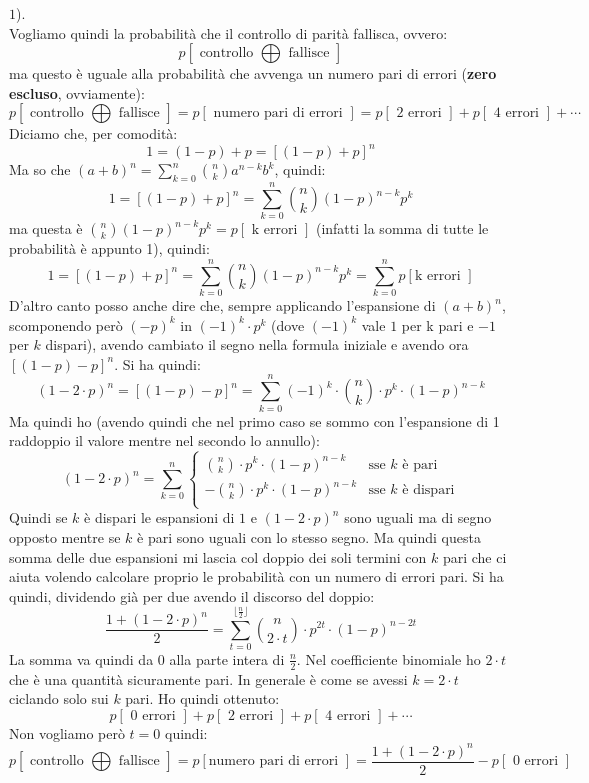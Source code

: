 \documentclass[a4paper,12pt, oneside]{book}
\begin{document}
$1$).\\ 
Vogliamo quindi la probabilità che il controllo di parità fallisca, ovvero:
\[p[\mbox{ controllo }\bigoplus \mbox{ fallisce }]\]
ma questo è uguale alla probabilità che avvenga un numero pari di errori
(\textbf{zero escluso}, ovviamente):
{\footnotesize{\[p[\mbox{ controllo }\bigoplus \mbox{ fallisce }]=p[\mbox{ numero
      pari di errori }]=p[\mbox{ 2 errori }]+p[\mbox{ 4 errori }]+\cdots \]}}
Diciamo che, per comodità:
\[1=(1-p)+p=[(1-p)+p]^n\]
Ma so che $(a+b)^n=\sum_{k=0}^n{{n}\choose{k}}a^{n-k}b^k$, quindi:
\[1=[(1-p)+p]^n=\sum_{k=0}^n{{n}\choose{k}}(1-p)^{n-k}p^k\]
ma questa è ${{n}\choose{k}}(1-p)^{n-k}p^k=p[\mbox{ k errori }]$ (infatti la
somma di tutte le probabilità è appunto 1), quindi:
\[1=[(1-p)+p]^n=\sum_{k=0}^n{{n}\choose{k}}(1-p)^{n-k}p^k=\sum_{k=0}^np[\mbox{
    k errori }]\]
D'altro canto posso anche dire che, sempre applicando l'espansione di $(a+b)^n$,
scomponendo però $(-p)^k$ in $(-1)^k\cdot p^k$ (dove $(-1)^k$ vale $1$ per k
pari e $-1$ per $k$ dispari), avendo cambiato il segno nella formula iniziale e
avendo ora $[(1-p)-p]^n$. Si ha quindi:
\[(1-2\cdot p)^n=[(1-p)-p]^n=\sum_{k=0}^n(-1)^k\cdot {{n}\choose{k}}\cdot
  p^k\cdot(1-p)^{n-k}\]
Ma quindi ho (avendo quindi che nel primo caso se sommo con l'espansione di 1
raddoppio il valore mentre nel secondo lo annullo):
\[(1-2\cdot p)^n=\sum_{k=0}^n
  \begin{cases}
    {{n}\choose{k}}\cdot  p^k\cdot(1-p)^{n-k} &\mbox{sse $k$ è pari}\\
    -{{n}\choose{k}}\cdot  p^k\cdot(1-p)^{n-k} &\mbox{sse $k$ è dispari}\\
  \end{cases}
\]
Quindi se $k$ è dispari le espansioni di $1$ e $(1-2\cdot p)^n$ sono uguali ma
di segno opposto mentre se $k$ è pari sono uguali con lo stesso segno. Ma quindi
questa somma delle due espansioni mi lascia col doppio dei soli termini con $k$
pari che ci aiuta volendo calcolare proprio le probabilità con un numero di
errori pari. Si ha quindi, dividendo già per due avendo il discorso del doppio:
\[\frac{1+(1-2\cdot p)^n}{2}=\sum_{t=0}^{\lfloor \frac{n}{2}\rfloor}
  {{n}\choose{2\cdot t}}\cdot p^{2t}\cdot(1-p)^{n-2t}\]
La somma va quindi da 0 alla parte intera di $\frac{n}{2}$. Nel coefficiente
binomiale ho $2\cdot t$ che è una quantità sicuramente pari. In generale è come
se avessi $k=2\cdot t$ ciclando solo sui $k$ pari. Ho quindi ottenuto:
\[p[\mbox{ 0 errori }]+p[\mbox{ 2 errori }]+p[\mbox{ 4 errori }]+\cdots \]
Non vogliamo però $t=0$ quindi:
{\footnotesize{\[p[\mbox{ controllo }\bigoplus \mbox{ fallisce }]=p[\mbox{
        numero pari di errori }]=\frac{1+(1-2\cdot 
    p)^n}{2}-p[\mbox{ 0 errori }]\]}}
\end{document}
